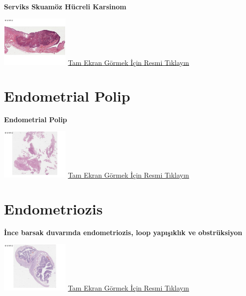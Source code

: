 \documentclass[
  letterpaper,
  DIV=11,
  numbers=noendperiod]{scrreprt}
\begin{document}
\textbf{Serviks Skuamöz Hücreli Karsinom}

\href{https://images.patolojiatlasi.com/cervix-SCC/HE.html}{\includegraphics[width=0.25\textwidth,height=\textheight]{./screenshots/cervix-SCC_screenshot.png}}
\href{https://images.patolojiatlasi.com/cervix-SCC/HE.html}{Tam Ekran
Görmek İçin Resmi Tıklayın}

\hypertarget{sec-endometrial-polip}{%
\chapter{Endometrial Polip}\label{sec-endometrial-polip}}

\textbf{Endometrial Polip}

\href{https://images.patolojiatlasi.com/endometrial-polyp/HE.html}{\includegraphics[width=0.25\textwidth,height=\textheight]{./screenshots/endometrial-polyp_screenshot.png}}
\href{https://images.patolojiatlasi.com/endometrial-polyp/HE.html}{Tam
Ekran Görmek İçin Resmi Tıklayın}

\hypertarget{sec-endometriozis}{%
\chapter{Endometriozis}\label{sec-endometriozis}}

\textbf{İnce barsak duvarında endometriozis, loop yapışıklık ve
obstrüksiyon}

\href{https://images.patolojiatlasi.com/endometriosis/HE.html}{\includegraphics[width=0.25\textwidth,height=\textheight]{./screenshots/endometriosis_screenshot.png}}
\href{https://images.patolojiatlasi.com/endometriosis/HE.html}{Tam Ekran
Görmek İçin Resmi Tıklayın}
\end{document}

